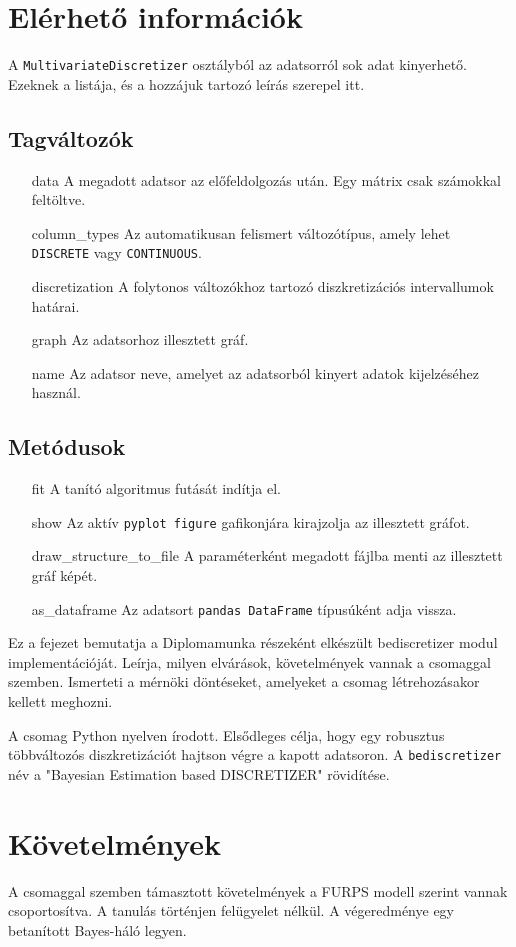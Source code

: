 \section{Elérhető információk}
A \verb|MultivariateDiscretizer| osztályból az adatsorról sok adat kinyerhető. Ezeknek a listája, és a hozzájuk tartozó leírás szerepel itt.

\subsection{Tagváltozók}
\begin{itemize}
    \item[data] A megadott adatsor az előfeldolgozás után. Egy mátrix csak számokkal feltöltve.
    \item[column\_types] Az automatikusan felismert változótípus, amely lehet \verb|DISCRETE| vagy \verb|CONTINUOUS|.
    \item[discretization] A folytonos változókhoz tartozó diszkretizációs intervallumok határai.
    \item[graph] Az adatsorhoz illesztett gráf.
    \item[name] Az adatsor neve, amelyet az adatsorból kinyert adatok kijelzéséhez használ.
\end{itemize}

\subsection{Metódusok}
\begin{itemize}
    \setlength{\itemindent}{5em}
    \item[fit] A tanító algoritmus futását indítja el.
    \item[show] Az aktív \verb|pyplot figure| gafikonjára kirajzolja az illesztett gráfot.
    \item[draw\_structure\_to\_file] A paraméterként megadott fájlba menti az illesztett gráf képét.
    \item[as\_dataframe] Az adatsort \verb|pandas DataFrame| típusúként adja vissza.
\end{itemize}
\fi

Ez a fejezet bemutatja a Diplomamunka részeként elkészült bediscretizer modul implementációját. Leírja, milyen elvárások, követelmények vannak a csomaggal szemben. Ismerteti a mérnöki döntéseket, amelyeket a csomag létrehozásakor kellett meghozni.

A csomag Python nyelven írodott. Elsődleges célja, hogy egy robusztus többváltozós diszkretizációt hajtson végre a kapott adatsoron. A \verb|bediscretizer| név a "Bayesian Estimation based DISCRETIZER" rövidítése.

\section{Követelmények}
A csomaggal szemben támasztott követelmények a FURPS modell \cite{grady1992practical} szerint vannak csoportosítva.
A tanulás történjen felügyelet nélkül. A végeredménye egy betanított Bayes-háló legyen.